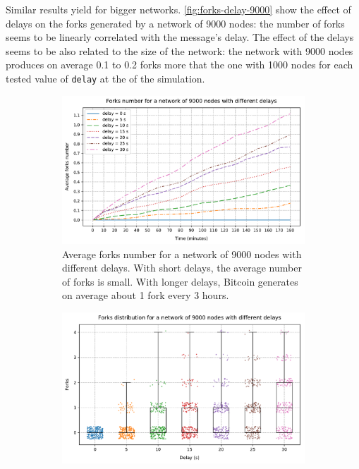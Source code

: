 \medskip
Similar results yield for bigger networks.
\cref{fig:forks-delay-9000} show the effect of delays on the forks generated by a network of \num{9000} nodes:
the number of forks seems to be linearly correlated with the message's delay.
The effect of the delays seems to be also related to the size of the network:
the network with \num{9000} nodes produces on average \num{0.1} to \num{0.2} forks more that the one with \num{1000} nodes for each tested value of \texttt{delay} at the of the simulation.

\begin{figure}[ht]
	\begin{subfigure}{\textwidth}
		\centering
		\includegraphics[width=\myplotswitdth \columnwidth]{plots/forks_delay_9000_linechart}
		\vspace*{0.25cm}
		\caption{
			Average forks number for a network of \num{9000} nodes with different delays.
			With short delays, the average number of forks is small.
			With longer delays, Bitcoin generates on average about \num{1} fork every \num{3} hours.
		}
		\vspace*{0.75cm}
	\end{subfigure}
	\begin{subfigure}{\textwidth}
		\centering
		\vspace*{0.25cm}
		\includegraphics[width=\myplotswitdth \columnwidth]{plots/forks_delay_9000_boxplot}

\end{subfigure}
\end{figure}
